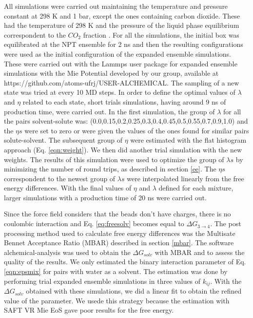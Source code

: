 All simulations were carried out maintaining the temperature and pressure constant at 298 K and 1 bar, except the ones containing carbon dioxide. These had the temperature of 298 K and the pressure of the liquid phase equilibrium correspondent to the $CO_{2}$ fraction \cite{co2toliq}. For all the simulations, the initial box was equilibrated at the NPT ensemble for 2 ns and then the resulting configurations were used as the initial configuration of the expanded ensemble simulations. These were carried out with the Lammps user package for expanded ensemble simulations with the Mie Potential developed by our group, available at https://github.com/atoms-ufrj/USER-ALCHEMICAL. The sampling of a new state was tried at every 10 MD steps. In order to define the optimal values of $\lambda$ and $\eta$ related to each state, short trials simulations, having around 9 ns of production time, were carried out. In the first simulation, the group of $\lambda$ for all the pairs solvent-solute was: (0.0,0.15,0.2,0.25,0.3,0.4,0.45,0.5,0.55,0.7,0.9,1.0) and the $\eta s$ were set to zero or were given the values of the ones found for similar pairs solute-solvent. The subsequent group of $\eta$ were estimated  with the flat histogram approach (Eq. \eqref{eqn:weight}). We then did another trial simulation with the new weights. The results of this simulation were used to optimize the group of $\lambda s$ by minimizing the number of round trips, as described in section \ref{ee}. The $\eta s$ correspondent to the newest group of $\lambda s$ were interpolated linearly from the free energy differences. With the final values of $\eta$ and $\lambda $ defined for each mixture, larger simulations with a production time of 20 ns were carried out. 

Since the force field considers that the beads don't have charges, there is no coulombic interaction and Eq. \eqref{eq:freesolv} becomes equal to $\Delta G_{3 \rightarrow 4} $. The post processing method used to calculate free energy differences was the Multisate Bennet Acceptance Ratio (MBAR) described in section \ref{mbar}. The software alchemical-analysis \cite{klimovich} was used to obtain the $\Delta G_{solv}$ with MBAR and to assess the quality of the results. We only estimated the binary interaction  parameter of Eq. \eqref{eqn:epsmix} for pairs with water as a solvent. The estimation was done by performing trial  expanded ensemble simulations in three values of $k_{ij}$. With the $\Delta G_{solv}$ obtained with these simulations, we did a linear fit to obtain the refined value of the parameter. We usede this strategy because the estimation with SAFT VR Mie EoS gave poor results for the free energy.

